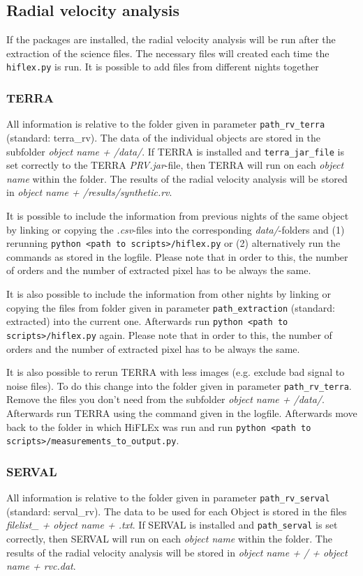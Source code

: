 \documentclass[10pt,a4paper]{article}
\begin{document}
\subsection{Radial velocity analysis}
If the packages are installed, the radial velocity analysis will be run after the extraction of the science files. The necessary files will created each time the \verb|hiflex.py| is run. It is possible to add files from different nights together

\subsubsection{TERRA}
\label{Section:files_folders_rv_for_terra}
All information is relative to the folder given in parameter \verb|path_rv_terra| (standard: terra\_rv). 
The data of the individual objects are stored in the subfolder \textit{object name + /data/}. If TERRA is installed and \verb|terra_jar_file| is set correctly to the TERRA \textit{PRV.jar}-file, then TERRA will run on each \textit{object name} within the folder. The results of the radial velocity analysis will be stored in \textit{object name + /results/synthetic.rv}.

It is possible to include the information from previous nights of the same object by linking or copying the \textit{.csv}-files into the corresponding \textit{data/}-folders and (1) rerunning \verb|python <path to scripts>/hiflex.py| or (2) alternatively run the commands as stored in the logfile. Please note that in order to this, the number of orders and the number of extracted pixel has to be always the same.

It is also possible to include the information from other nights by linking or copying the files from folder given in parameter \verb|path_extraction| (standard: extracted) into the current one. Afterwards run \verb|python <path to scripts>/hiflex.py| again. Please note that in order to this, the number of orders and the number of extracted pixel has to be always the same.

It is also possible to rerun TERRA with less images (e.g. exclude bad signal to noise files). To do this change into the folder given in parameter \verb|path_rv_terra|. Remove the files you don't need from the subfolder \textit{object name + /data/}. Afterwards run TERRA using the command given in the logfile. Afterwards move back to the folder in which HiFLEx was run and run \verb|python <path to scripts>/measurements_to_output.py|.

\subsubsection{SERVAL}
\label{Section:files_folders_rv_for_serval}
All information is relative to the folder given in parameter \verb|path_rv_serval| (standard: serval\_rv). 
The data to be used for each Object is stored in the files \textit{filelist\_ + object name + .txt}. If SERVAL is installed and \verb|path_serval| is set correctly, then SERVAL will run on each \textit{object name} within the folder. The results of the radial velocity analysis will be stored in \textit{object name + / + object name + rvc.dat}.
\end{document}
